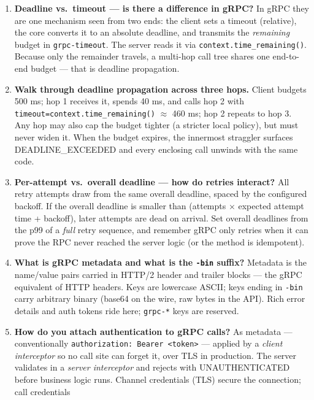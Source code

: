 \begin{enumerate}[label=\textbf{Q\arabic*.}, leftmargin=1.5cm]
  \item \textbf{Deadline vs.\ timeout --- is there a difference in gRPC?}
        In gRPC they are one mechanism seen from two ends: the client sets a
        timeout (relative), the core converts it to an absolute deadline, and
        transmits the \emph{remaining} budget in \texttt{grpc-timeout}. The
        server reads it via \texttt{context.time\_remaining()}. Because only
        the remainder travels, a multi-hop call tree shares one end-to-end
        budget --- that is deadline propagation.
  \item \textbf{Walk through deadline propagation across three hops.}
        Client budgets 500 ms; hop 1 receives it, spends 40 ms, and calls hop 2
        with \texttt{timeout=context.time\_remaining()} $\approx$ 460 ms; hop 2
        repeats to hop 3. Any hop may also cap the budget tighter (a stricter
        local policy), but must never widen it. When the budget expires, the
        innermost straggler surfaces DEADLINE\_EXCEEDED and every enclosing
        call unwinds with the same code.
  \item \textbf{Per-attempt vs.\ overall deadline --- how do retries
        interact?}
        All retry attempts draw from the same overall deadline, spaced by the
        configured backoff. If the overall deadline is smaller than
        (attempts $\times$ expected attempt time + backoff), later attempts are
        dead on arrival. Set overall deadlines from the p99 of a \emph{full}
        retry sequence, and remember gRPC only retries when it can prove the
        RPC never reached the server logic (or the method is idempotent).
  \item \textbf{What is gRPC metadata and what is the \texttt{-bin} suffix?}
        Metadata is the name/value pairs carried in HTTP/2 header and trailer
        blocks --- the gRPC equivalent of HTTP headers. Keys are lowercase
        ASCII; keys ending in \texttt{-bin} carry arbitrary binary (base64 on
        the wire, raw bytes in the API). Rich error details and auth tokens
        ride here; \texttt{grpc-*} keys are reserved.
  \item \textbf{How do you attach authentication to gRPC calls?}
        As metadata --- conventionally \texttt{authorization: Bearer <token>}
        --- applied by a \emph{client interceptor} so no call site can forget
        it, over TLS in production. The server validates in a \emph{server
        interceptor} and rejects with UNAUTHENTICATED before business logic
        runs. Channel credentials (TLS) secure the connection; call credentials

\end{enumerate}
